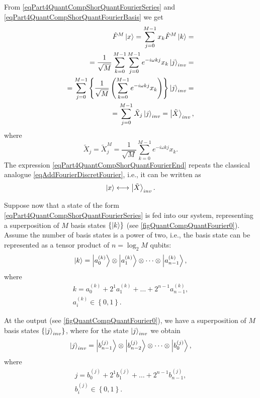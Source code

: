 From \eqref{eqPart4QuantCompShorQuantFourierSeries} and \eqref{eqPart4QuantCompShorQuantFourierBasis} we get
\begin{eqnarray}
\hat{F}^{M}\ket{x} = \sum_{j = 0}^{M - 1}x_k \hat{F}^{M}
\ket{k} = 
\nonumber \\
= \frac{1}{\sqrt{M}}\sum_{k = 0}^{M -1}\sum_{j = 0}^{M - 1}
e^{-i \omega k j}x_k\ket{j}_{inv} = 
\nonumber \\
= \sum_{j = 0}^{M - 1} \left\{\frac{1}{\sqrt{M}}\left(
\sum_{k = 0}^{M - 1}e^{-i \omega k j} x_k
\right)\right\}\ket{j}_{inv} = 
\nonumber \\
= \sum_{j = 0}^{M - 1}\tilde{X}_j\ket{j}_{inv} = \left|\tilde{X}\right>_{inv},
\nonumber
\end{eqnarray}
where 
\begin{equation}
\tilde{X}_j = \tilde{X}_j^{M} = 
\frac{1}{\sqrt{M}}\sum_{k = 0}^{M - 1}e^{-i \omega k j} x_k.
\label{eqPart4QuantCompShorQuantFourierEnd}
\end{equation}
The expression \eqref{eqPart4QuantCompShorQuantFourierEnd} repeats the classical analogue \eqref{eqAddFourierDiscretFourier}, i.e., it can be written as
\[
 \ket{x} \longleftrightarrow \left|\tilde{X}\right>_{inv}.
\]



Suppose now that a state of the form \eqref{eqPart4QuantCompShorQuantFourierSeries} is fed into our system, representing a superposition of $M$ basis states $\left\{\ket{k}\right\}$ (see \autoref{figQuantCompQuantFourier0}). Assume the number of basis states is a power of two, i.e., the basis state can be represented as a tensor product of $n = \log_2{M}$ qubits:
\begin{equation}
\ket{k} = \ket{a^{(k)}_0} \otimes  \ket{a^{(k)}_1}
\otimes \cdots \otimes \ket{a^{(k)}_{n-1}}, 
\nonumber
\end{equation}
where
\begin{eqnarray}
k = a^{(k)}_0 + 2^1 a^{(k)}_1 + \dots + 2^{n-1} a^{(k)}_{n-1},
\nonumber \\
a^{(k)}_i \in \left\{0, 1\right\}.
\nonumber
\end{eqnarray}

At the output (see \autoref{figQuantCompQuantFourier0}), we have a superposition of $M$ basis states $\left\{\ket{j}_{inv}\right\}$, where for the state $\ket{j}_{inv}$ we obtain
\begin{equation}
\ket{j}_{inv} = \ket{b^{(j)}_{n-1}} \otimes
\ket{b^{(j)}_{n-2}} 
\otimes \cdots \otimes \ket{b^{(j)}_{0}}, 
\nonumber
\end{equation}
where
\begin{eqnarray}
j = b^{(j)}_0 + 2^1 b^{(j)}_1 + \dots + 2^{n-1} b^{(j)}_{n-1},
\nonumber \\
b^{(j)}_i \in \left\{0, 1\right\}.
\nonumber
\end{eqnarray}

